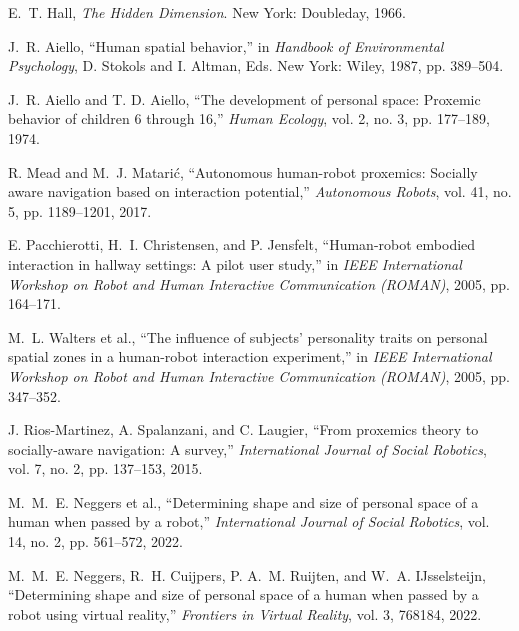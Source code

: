 \documentclass[12pt,a4paper,oneside]{book}
\begin{document}
\begin{enumerate}[label={[\arabic*]}, leftmargin=*]

\item \label{Hall1966} E.~T. Hall, \emph{The Hidden Dimension}. New York: Doubleday, 1966.

\item \label{Aiello1987} J.~R. Aiello, ``Human spatial behavior,'' in \emph{Handbook of Environmental Psychology}, D. Stokols and I. Altman, Eds. New York: Wiley, 1987, pp. 389--504.

\item \label{AielloAiello1974} J.~R. Aiello and T. D. Aiello, ``The development of personal space: Proxemic behavior of children 6 through 16,'' \emph{Human Ecology}, vol. 2, no. 3, pp. 177--189, 1974.

\item \label{Mead2017} R. Mead and M.~J. Matarić, ``Autonomous human-robot proxemics: Socially aware navigation based on interaction potential,'' \emph{Autonomous Robots}, vol. 41, no. 5, pp. 1189--1201, 2017.

\item \label{Pacchierotti2005} E. Pacchierotti, H.~I. Christensen, and P. Jensfelt, ``Human-robot embodied interaction in hallway settings: A pilot user study,'' in \emph{IEEE International Workshop on Robot and Human Interactive Communication (ROMAN)}, 2005, pp. 164--171.

\item \label{Walters2005} M.~L. Walters et al., ``The influence of subjects' personality traits on personal spatial zones in a human-robot interaction experiment,'' in \emph{IEEE International Workshop on Robot and Human Interactive Communication (ROMAN)}, 2005, pp. 347--352.

\item \label{RiosMartinez2015} J. Rios-Martinez, A. Spalanzani, and C. Laugier, ``From proxemics theory to socially-aware navigation: A survey,'' \emph{International Journal of Social Robotics}, vol. 7, no. 2, pp. 137--153, 2015.

\item \label{Neggers2024} M.~M.~E. Neggers et al., ``Determining shape and size of personal space of a human when passed by a robot,'' \emph{International Journal of Social Robotics}, vol. 14, no. 2, pp. 561--572, 2022.

\item \label{Neggers2022} M.~M.~E. Neggers, R.~H. Cuijpers, P. A.~M. Ruijten, and W.~A. IJsselsteijn, ``Determining shape and size of personal space of a human when passed by a robot using virtual reality,'' \emph{Frontiers in Virtual Reality}, vol. 3, 768184, 2022.


\end{enumerate}
\end{document}

